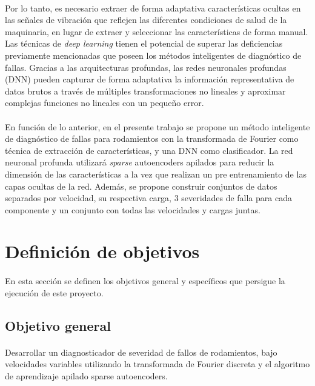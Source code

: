 \documentclass[12pt]{article}
\begin{document}
\paragraph{}
Por lo tanto, es necesario extraer de forma adaptativa características ocultas en las señales de vibración que reflejen las diferentes condiciones de salud de la maquinaria, en lugar de extraer y seleccionar las características de forma manual. Las técnicas de \textit{deep learning} tienen el potencial de superar las deficiencias previamente mencionadas que poseen los métodos inteligentes de diagnóstico de fallas. Gracias a las arquitecturas profundas, las redes neuronales profundas (DNN) pueden capturar de forma adaptativa la información representativa de datos brutos a través de múltiples transformaciones no lineales y aproximar complejas funciones no lineales con un pequeño error.

\paragraph{}
En función de lo anterior, en el presente trabajo se propone un método inteligente de diagnóstico de fallas para rodamientos con la transformada de Fourier como técnica de extracción de características, y una DNN como clasificador. La red neuronal profunda utilizará \textit{sparse} autoencoders apilados para reducir la dimensión de las características a la vez que realizan un pre entrenamiento de las capas ocultas de la red. Además, se propone construir conjuntos de datos separados por velocidad, su respectiva carga, 3 severidades de falla para cada componente y un conjunto con todas las velocidades y cargas juntas.

\newpage
\section{Definición de objetivos}
\paragraph{}
En esta sección se definen los objetivos general y específicos que persigue la ejecución de este proyecto.
\subsection{Objetivo general}
\paragraph{}
Desarrollar un diagnosticador de severidad de fallos de rodamientos, bajo velocidades variables utilizando la transformada de Fourier discreta y el algoritmo de aprendizaje apilado sparse autoencoders.
\end{document}
